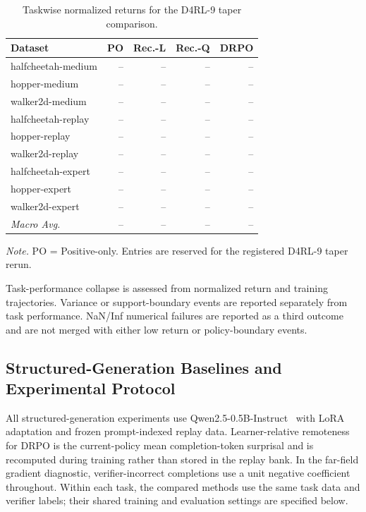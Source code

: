 \documentclass{article}
\theoremstyle{plain}
\theoremstyle{definition}
\theoremstyle{remark}
\begin{document}
\begin{table}[t]
\centering
\caption{Taskwise normalized returns for the D4RL-9 taper comparison.}
\label{tab:app_d4rl9_taper_taskwise}

\small
\setlength{\tabcolsep}{5.0pt}
\renewcommand{\arraystretch}{1.08}

\begin{tabular}{@{}lrrrr@{}}
\toprule
Dataset & PO & Rec.-L & Rec.-Q & DRPO \\
\midrule
halfcheetah-medium & -- & -- & -- & -- \\
hopper-medium & -- & -- & -- & -- \\
walker2d-medium & -- & -- & -- & -- \\
halfcheetah-replay & -- & -- & -- & -- \\
hopper-replay & -- & -- & -- & -- \\
walker2d-replay & -- & -- & -- & -- \\
halfcheetah-expert & -- & -- & -- & -- \\
hopper-expert & -- & -- & -- & -- \\
walker2d-expert & -- & -- & -- & -- \\
\midrule
\textit{Macro Avg.} & -- & -- & -- & -- \\
\bottomrule
\end{tabular}

\vspace{2pt}
\begin{minipage}{\columnwidth}
\small
\textit{Note.} PO = Positive-only. Entries are reserved for the
registered D4RL-9 taper rerun.
\end{minipage}
\end{table}

Task-performance collapse is assessed from normalized return and
training trajectories. Variance or support-boundary events are reported
separately from task performance. NaN/Inf numerical failures are
reported as a third outcome and are not merged with either low return or
policy-boundary events. 


\subsection{Structured-Generation Baselines and Experimental Protocol}
\label{app:structured_generation_methods}

All structured-generation experiments use
Qwen2.5-0.5B-Instruct~\citep{qwen2024qwen25} with LoRA adaptation and
frozen prompt-indexed replay data. Learner-relative remoteness for DRPO is
the current-policy mean completion-token surprisal and is recomputed during
training rather than stored in the replay bank. In the far-field gradient
diagnostic, verifier-incorrect completions use a unit negative coefficient
throughout. Within each task, the compared methods use the same task data and
verifier labels; their shared training and evaluation settings are specified
below.
\end{document}
